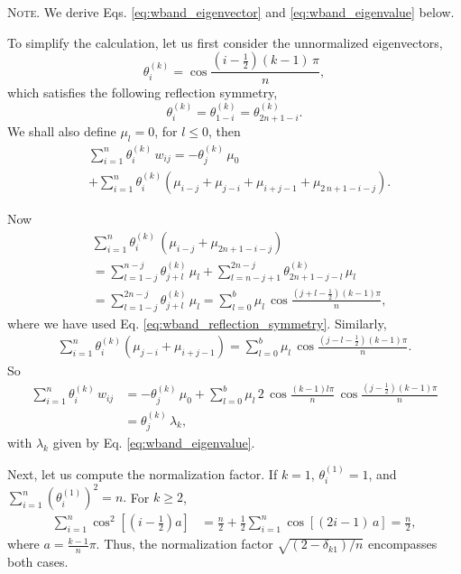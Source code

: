 \documentclass[reprint]{revtex4-1}
\newcommand{\note}[1]{{\color{DarkGreen}\footnotesize \textsc{Note.} #1}}
\begin{document}
\note{We derive Eqs.
  \eqref{eq:wband_eigenvector} and \eqref{eq:wband_eigenvalue}
  below.

  To simplify the calculation,
  let us first consider the unnormalized eigenvectors,
  $$
  \theta^{(k)}_i
  =
  \cos \frac{ \left( i - \frac 1 2 \right) (k - 1) \, \pi}{n},
  $$
  which satisfies the following reflection symmetry,
  \begin{equation}
    \theta^{(k)}_i = \theta^{(k)}_{1 - i} = \theta^{(k)}_{ 2 n + 1 - i }.
    \label{eq:wband_reflection_symmetry}
  \end{equation}
  We shall also define $\mu_l = 0$, for $l \le 0$, then
$$
\begin{aligned}
&\sum_{i = 1}^n
  \theta^{(k)}_i
  \, w_{ij}
=
- \theta^{(k)}_j \, \mu_0
\\
&
+\sum_{i = 1}^n
  \theta^{(k)}_i
  \left(
    \mu_{i - j} + \mu_{j - i} + \mu_{i + j - 1} + \mu_{2 \, n + 1 - i - j}
  \right)
.
\end{aligned}
$$

Now
$$
\begin{aligned}
  &
  \sum_{i = 1}^n
  \theta^{(k)}_i \,
  \left(
    \mu_{i - j} + \mu_{ 2 n + 1 - i - j }
  \right)
  \\
  &=
  \sum_{l=1-j}^{n-j} \theta^{(k)}_{j+l} \, \mu_l
  +
  \sum_{l = n-j+1}^{2n-j} \theta^{(k)}_{2n+1-j-l} \, \mu_l
  \\
  &=
  \sum_{l=1-j}^{2n-j} \theta^{(k)}_{j+l} \, \mu_l
  =
  \sum_{l=0}^{b} \mu_l \, \cos\frac{(j+l-\frac12)(k-1)\pi}{n},
\end{aligned}
$$
where we have used Eq. \eqref{eq:wband_reflection_symmetry}.
%
Similarly,
$$
\begin{aligned}
  \sum_{i = 1}^n
  \theta^{(k)}_i
  \left(
    \mu_{j - i} + \mu_{i+j-1}
  \right)
  =
  \sum_{l=0}^{b} \mu_l \, \cos\frac{(j-l-\frac12)(k-1)\pi}{n}.
\end{aligned}
$$
%
So
$$
\begin{aligned}
\sum_{i = 1}^n \theta^{(k)}_i \, w_{ij}
&=
- \theta^{(k)}_j \, \mu_0
+\sum_{l=0}^{b} \mu_l \, 2 \, \cos\frac{(k-1)l\pi}{n} \, \cos\frac{(j-\frac12)(k-1)\pi}{n}
\\
&= \theta^{(k)}_j \, \lambda_k,
\end{aligned}
$$
with $\lambda_k$ given by Eq. \eqref{eq:wband_eigenvalue}.

Next, let us compute the normalization factor.
%
If $k = 1$, $\theta^{(1)}_i = 1$, and
$
\sum_{i = 1}^n \left( \theta^{(1)}_i \right)^2 = n.
$
For $k \ge 2$,
$$
\begin{aligned}
  \sum_{i = 1}^n \cos^2 \left[\left(i - \frac1 2 \right) a\right]
  &=
  \frac n 2
  +
  \frac 1 2
  \sum_{i = 1}^n \cos\left[(2 i - 1)\, a \right]
  =
  \frac n 2,
\end{aligned}
$$
where $a = \frac{k-1}{n} \pi$.
Thus, the normalization factor $\sqrt{(2 - \delta_{k1})/n}$
encompasses both cases.

}
\end{document}
